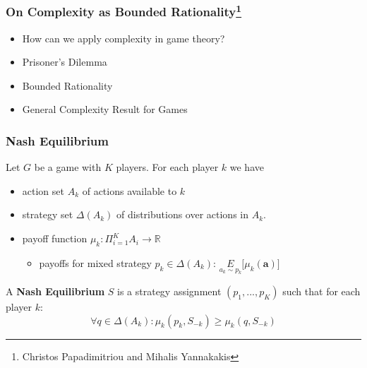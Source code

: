 \documentclass{beamer}
\begin{document}
\begin{frame}
	\frametitle{On Complexity as Bounded Rationality\footnote{Christos Papadimitriou and Mihalis Yannakakis}}
	
	\begin{itemize}
		\item How can we apply complexity in game theory?
		\item Prisoner's Dilemma
		\item Bounded Rationality
		\item General Complexity Result for Games
	\end{itemize}
	
\end{frame}

\begin{frame}
	\frametitle{Nash Equilibrium}
	Let $G$ be a game with $K$ players. For each player $k$ we have
	\begin{itemize}
		\item action set $A_k$ of actions available to $k$
		\item strategy set $\Delta(A_k)$ of distributions over actions in $A_k$.
		\item payoff function $\mu_k: \Pi_{i=1}^K A_i \longrightarrow \mathbb{R}$
		\begin{itemize}
			\item payoffs for mixed strategy $p_k \in \Delta(A_k)$: $\underset{a_k \sim p_k}{E}\lbrack \mu_k(\textbf{a}) \rbrack$
		\end{itemize}
	\end{itemize}
	
	A \textbf{Nash Equilibrium} $S$ is a strategy assignment $(p_1,..., p_K)$ such that for each player $k$:
	\begin{equation}
	\forall q \in \Delta(A_k): \mu_k(p_k, S_{-k}) \ge \mu_k(q, S_{-k})
	\end{equation}
	
\end{frame}
\end{document}
